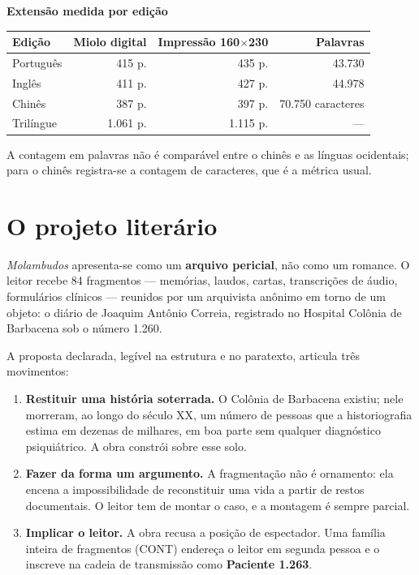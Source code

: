 \documentclass[11pt,a4paper]{article}
\begin{document}
\vspace{0.6em}
\noindent\textbf{Extensão medida por edição}

\begin{center}\small
\begin{tabular}{@{}lrrr@{}}
\toprule
\textbf{Edição} & \textbf{Miolo digital} & \textbf{Impressão 160$\times$230} & \textbf{Palavras} \\
\midrule
Português   & 415 p. & 435 p. & 43.730 \\
Inglês      & 411 p. & 427 p. & 44.978 \\
Chinês      & 387 p. & 397 p. & 70.750 caracteres \\
Trilíngue   & 1.061 p. & 1.115 p. & --- \\
\bottomrule
\end{tabular}
\end{center}

\noindent\small A contagem em palavras não é comparável entre o chinês e as
línguas ocidentais; para o chinês registra-se a contagem de caracteres, que é
a métrica usual.

\section{O projeto literário}

\textit{Molambudos} apresenta-se como um \textbf{arquivo pericial}, não como
um romance. O leitor recebe 84 fragmentos --- memórias, laudos, cartas,
transcrições de áudio, formulários clínicos --- reunidos por um arquivista
anônimo em torno de um objeto: o diário de Joaquim Antônio Correia,
registrado no Hospital Colônia de Barbacena sob o número 1.260.

A proposta declarada, legível na estrutura e no paratexto, articula três
movimentos:

\begin{enumerate}
\item \textbf{Restituir uma história soterrada.} O Colônia de Barbacena
existiu; nele morreram, ao longo do século XX, um número de pessoas que a
historiografia estima em dezenas de milhares, em boa parte sem qualquer
diagnóstico psiquiátrico. A obra constrói sobre esse solo.

\item \textbf{Fazer da forma um argumento.} A fragmentação não é ornamento:
ela encena a impossibilidade de reconstituir uma vida a partir de restos
documentais. O leitor tem de montar o caso, e a montagem é sempre parcial.

\item \textbf{Implicar o leitor.} A obra recusa a posição de espectador. Uma
família inteira de fragmentos (CONT) endereça o leitor em segunda pessoa e o
inscreve na cadeia de transmissão como \textbf{Paciente 1.263}.
\end{enumerate}
\end{document}
